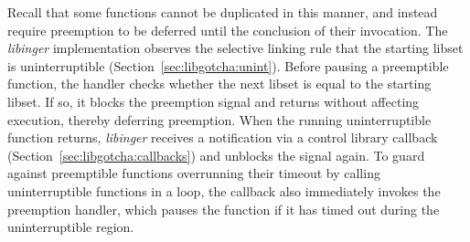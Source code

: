 Recall that some functions cannot be duplicated in this manner, and instead require
preemption to be deferred until the conclusion of their invocation.  The
\textit{libinger} implementation observes the selective linking rule that the
starting libset is uninterruptible (Section~\ref{sec:libgotcha:unint}).  Before
pausing a preemptible function, the handler checks whether the next libset is equal
to the starting libset.  If so, it blocks the preemption signal and returns without
affecting execution, thereby deferring preemption.  When the running uninterruptible
function returns, \textit{libinger} receives a notification via a control library
callback (Section~\ref{sec:libgotcha:callbacks}) and unblocks the signal again.  To
guard against preemptible functions overrunning their timeout by calling
uninterruptible functions in a loop, the callback also immediately invokes the
preemption handler, which pauses the function if it has timed out during the
uninterruptible region.

